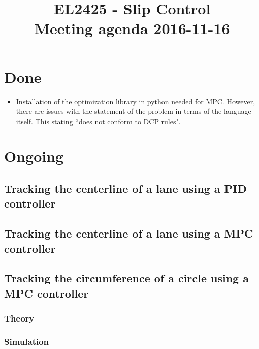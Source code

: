 \documentclass[oneside,12pt]{article}
\title{EL2425 - Slip Control \\ Meeting agenda 2016-11-16}
\begin{document}
\maketitle

\section{Done}

\begin{itemize}
  \item Installation of the optimization library in python needed for MPC.
    However, there are issues with the statement of the problem in terms of the
    language itself. This stating ``does not conform to DCP rules".
\end{itemize}



\section{Ongoing}

  \subsection{Tracking the centerline of a lane using a PID controller}

    

  \subsection{Tracking the centerline of a lane using a MPC controller}

    


  \subsection{Tracking the circumference of a circle using a MPC controller}

    \subsubsection{Theory}
      
    \subsubsection{Simulation}
      
\end{document}
